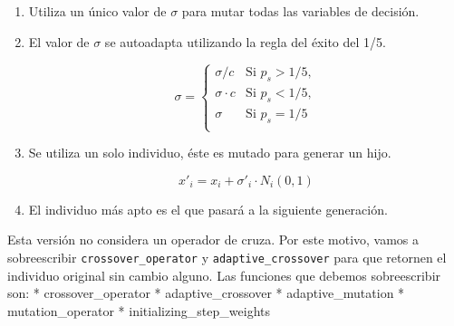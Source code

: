 \documentclass[11pt]{article}
\providecommand{\tightlist}{%
      \setlength{\itemsep}{0pt}\setlength{\parskip}{0pt}}
\begin{document}
\begin{enumerate}
\def\labelenumi{\arabic{enumi}.}
\tightlist
\item
  Utiliza un único valor de \(\sigma\) para mutar todas las variables de
  decisión.
\item
  El valor de \(\sigma\) se autoadapta utilizando la regla del éxito del
  1/5.

  \begin{equation}
    \sigma =
    \begin{cases}
     \sigma / c & \text{Si } p_s > 1/5, \\
     \sigma \cdot c & \text{Si } p_s < 1/5, \\
     \sigma  & \text{Si } p_s = 1/5 \\
    \end{cases}
  \end{equation}
\item
  Se utiliza un solo individuo, éste es mutado para generar un hijo.

  \begin{equation}
    \label{eq:mutarVariables}
     x'_i = x_i + \sigma'_i \cdot N_i(0, 1)
  \end{equation}
\item
  El individuo más apto es el que pasará a la siguiente generación.
\end{enumerate}

Esta versión no considera un operador de cruza. Por este motivo, vamos a
sobreescribir \texttt{crossover\_operator} y
\texttt{adaptive\_crossover} para que retornen el individuo original sin
cambio alguno. Las funciones que debemos sobreescribir son: *
crossover\_operator * adaptive\_crossover * adaptive\_mutation *
mutation\_operator * initializing\_step\_weights
\end{document}
